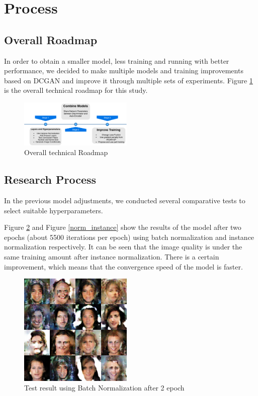 \section{Process}
\subsection{Overall Roadmap}

In order to obtain a smaller model, less training and running with better performance, we decided to make multiple models and training improvements based on DCGAN and improve it through multiple sets of experiments.
Figure \ref{roadmap} is the overall technical roadmap for this study.

\begin{figure}
    \begin{center}
    \includegraphics[width=0.48\textwidth]{figures/roadmap.pdf}
    \caption{Overall technical Roadmap}
    \label{roadmap}
    \end{center}
\end{figure}


\subsection{Research Process}

In the previous model adjustments, we conducted several comparative tests to select suitable
hyperparameters.

Figure \ref{norm_bach} and Figure \ref{norm_instance} show the results of the model after two epochs (about 5500 iterations per epoch) using batch normalization and instance normalization respectively.
It can be seen that the image quality is under the same training amount after instance normalization. There is a certain improvement, which means that the convergence speed of the model is faster.

\begin{figure}
    \begin{center}
    \includegraphics[width=0.48\textwidth]{figures/result_norm_batch.png}
    \caption{Test result using Batch Normalization after 2 epoch}
    \label{norm_bach}
    \end{center}
\end{figure}

